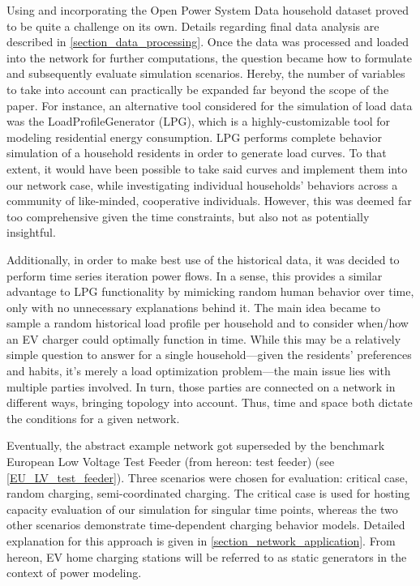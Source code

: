 \documentclass[a4paper,10pt]{report}
\begin{document}
Using and incorporating the Open Power System Data household dataset proved to be quite a challenge on its own. Details regarding final data analysis are described in \cref{section_data_processing}. Once the data was processed and loaded into the network for further computations, the question became how to formulate and subsequently evaluate simulation scenarios. Hereby, the number of variables to take into account can practically be expanded far beyond the scope of the paper. For instance, an alternative tool considered for the simulation of load data was the LoadProfileGenerator (LPG), which is a highly-customizable tool for modeling residential energy consumption. LPG performs complete behavior simulation of a household residents in order to generate load curves. To that extent, it would have been possible to take said curves and implement them into our network case, while investigating individual households' behaviors across a community of like-minded, cooperative individuals. However, this was deemed far too comprehensive given the time constraints, but also not as potentially insightful.

Additionally, in order to make best use of the historical data, it was decided to perform time series iteration power flows. In a sense, this provides a similar advantage to LPG functionality by mimicking random human behavior over time, only with no unnecessary explanations behind it. The main idea became to sample a random historical load profile per household and to consider when/how an EV charger could optimally function in time. While this may be a relatively simple question to answer for a single household---given the residents' preferences and habits, it's merely a load optimization problem---the main issue lies with multiple parties involved. In turn, those parties are connected on a network in different ways, bringing topology into account. Thus, time and space both dictate the conditions for a given network.

Eventually, the abstract example network got superseded by the benchmark European Low Voltage Test Feeder (from hereon: test feeder) (see \cref{EU_LV_test_feeder}). Three scenarios were chosen for evaluation: critical case, random charging, semi-coordinated charging. The critical case is used for hosting capacity evaluation of our simulation for singular time points, whereas the two other scenarios demonstrate time-dependent charging behavior models. Detailed explanation for this approach is given in \cref{section_network_application}. From hereon, EV home charging stations will be referred to as static generators in the context of power modeling.
\end{document}
